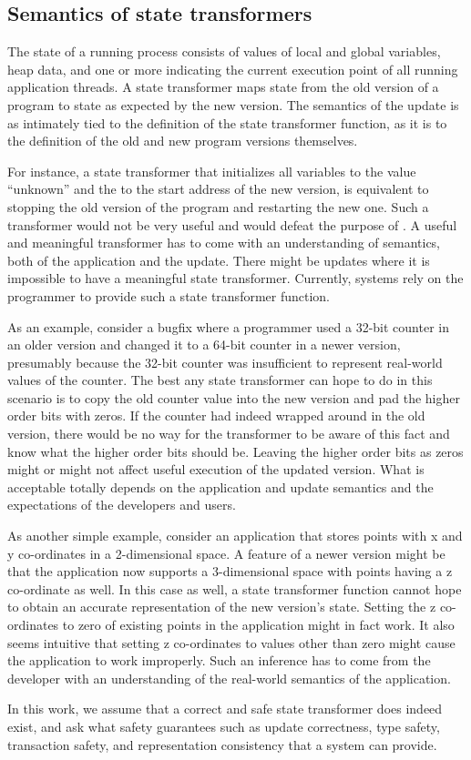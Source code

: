 \subsection{Semantics of state transformers}
The state of a running process consists of values of local and
global variables, heap data, and one or more \PCs indicating the current
execution point of all running application threads. A state transformer
maps state from the old version of a program to state as expected
by the new version. The semantics of the update is as intimately tied to
the definition of the state transformer function, as it is to the
definition of the old and new program versions themselves.

For instance, a state transformer that initializes all variables to the
value ``unknown'' and the \PC to the start address of the new version, is
equivalent to stopping the old version of the program and restarting the
new one. Such a transformer would not be very useful and would defeat
the purpose of \USD. A useful and meaningful transformer has to come with
an understanding of semantics, both of the application and the update.
There might be updates where it is impossible to have a meaningful state
transformer.  Currently, \USD systems rely on the programmer to provide
such a state transformer function.

As an example,
consider a bugfix where a programmer used a 32-bit counter in
an older version and changed it to a 64-bit counter in a newer version,
presumably because the 32-bit counter was insufficient to represent
real-world values of the counter. The best any state transformer can hope
to do in this scenario is to copy the old counter value into the new
version and pad the higher order bits with zeros. If the counter had indeed
wrapped around in the old version, there would be no way for the
transformer to be aware of this fact and know what the higher order bits
should be. Leaving the higher order bits as zeros might or might not affect useful
execution of the updated version. What is acceptable
totally depends on the application and update semantics and the
expectations of the developers and users.

As another simple example, consider an application that stores points with
x and y co-ordinates in a 2-dimensional space. A feature of a newer version
might be that the application now supports a 3-dimensional space with
points having a z co-ordinate as well. In this case as well, a state
transformer function cannot hope to obtain an accurate representation of
the new version's state. Setting the z co-ordinates to zero of existing
points in the application might in fact work. It also seems intuitive that
setting z co-ordinates to values other than zero might cause the
application to work improperly. Such an inference has to come from the
developer with an understanding of the real-world semantics of the
application.

In this work, we assume that a correct and safe state transformer does
indeed exist, and ask what safety guarantees such as update correctness,
type safety, transaction safety, and representation consistency that a \USD
system can provide.
